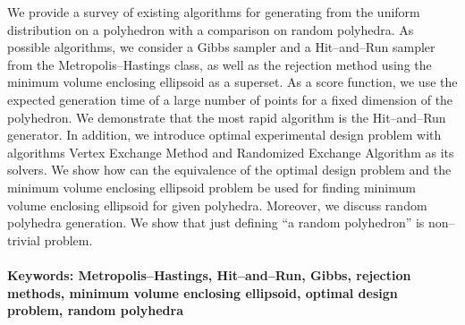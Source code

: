 \documentclass[12pt, twoside]{book}
\begin{document}
We provide a survey of existing algorithms for generating from the uniform distribution on a polyhedron with a comparison on random polyhedra. As possible algorithms, we consider a Gibbs sampler and a Hit--and--Run sampler from the Metropolis--Hastings class, as well as the rejection method using the minimum volume enclosing ellipsoid as a superset. As a score function, we use the expected generation time of a large number of points for a fixed dimension of the polyhedron. We demonstrate that the most rapid algorithm is the Hit--and--Run generator. In addition, we introduce optimal experimental design problem with algorithms Vertex Exchange Method and Randomized Exchange Algorithm as its solvers. We show how can the equivalence of the optimal design problem and the minimum volume enclosing ellipsoid problem be used for finding minimum volume enclosing ellipsoid for given polyhedra. Moreover, we discuss random polyhedra generation. We show that just defining ``a random polyhedron'' is non--trivial problem.


\paragraph*{Keywords: Metropolis--Hastings, Hit--and--Run, Gibbs, rejection methods, minimum volume enclosing ellipsoid, optimal design problem, random polyhedra} 


%
%



\newpage 

\tableofcontents



\newpage 

\end{document}
